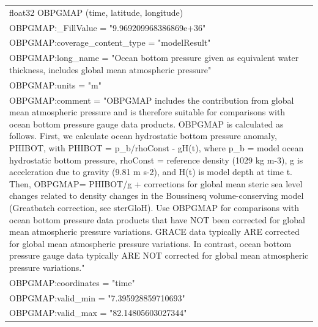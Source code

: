 \begin{longtable}{|p{\textwidth}|}
\hspace{0.5cm}float32 OBPGMAP (time, latitude, longitude)\\
\hspace{0.5cm}\hspace{0.5cm}OBPGMAP:\_FillValue = "9.969209968386869e+36"\\
\hspace{0.5cm}\hspace{0.5cm}OBPGMAP:coverage\_content\_type = "modelResult"\\
\hspace{0.5cm}\hspace{0.5cm}OBPGMAP:long\_name = "Ocean bottom pressure given as equivalent water thickness, includes global mean atmospheric pressure"\\
\hspace{0.5cm}\hspace{0.5cm}OBPGMAP:units = "m"\\
\hspace{0.5cm}\hspace{0.5cm}OBPGMAP:comment = "OBPGMAP includes the contribution from global mean atmospheric pressure and is therefore suitable for comparisons with ocean bottom pressure gauge data products. OBPGMAP is calculated as follows. First, we calculate ocean hydrostatic bottom pressure anomaly, PHIBOT, with PHIBOT = p\_b/rhoConst - gH(t), where p\_b = model ocean hydrostatic bottom pressure, rhoConst = reference density (1029 kg m-3), g is acceleration due to gravity (9.81 m s-2), and H(t) is model depth at time t. Then, OBPGMAP= PHIBOT/g + corrections for global mean steric sea level changes related to density changes in the Boussinesq volume-conserving model (Greatbatch correction, see sterGloH). Use OBPGMAP for comparisons with ocean bottom pressure data products that have NOT been corrected for global mean atmospheric pressure variations. GRACE data typically ARE corrected for global mean atmospheric pressure variations. In contrast, ocean bottom pressure gauge data typically ARE NOT corrected for global mean atmospheric pressure variations."\\
\hspace{0.5cm}\hspace{0.5cm}OBPGMAP:coordinates = "time"\\
\hspace{0.5cm}\hspace{0.5cm}OBPGMAP:valid\_min = "7.395928859710693"\\
\hspace{0.5cm}\hspace{0.5cm}OBPGMAP:valid\_max = "82.14805603027344"\\
\hline
\end{longtable}